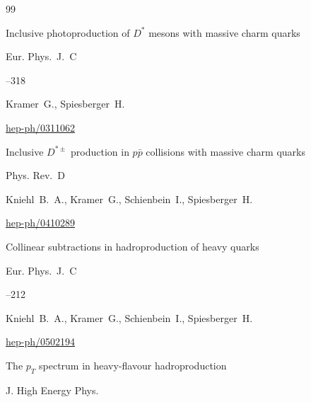 \begin{thebibliography}{99}

\paper Inclusive photoproduction of $D^*$ mesons with massive charm quarks


\jour Eur. Phys.~J.~C 



--318

\by Kramer~G., Spiesberger~H.


\arxiv \href{http://arxiv.org/abs/hep-ph/0311062}{hep-ph/0311062}






\paper Inclusive $D^{*\pm}$ production in $p\bar p$ collisions with massive charm quarks


\jour Phys. Rev.~D 



\by Kniehl~B.~A., Kramer~G., Schienbein~I., Spiesberger~H. 



\arxiv \href{http://arxiv.org/abs/hep-ph/0410289}{hep-ph/0410289}




\paper Collinear subtractions in hadroproduction of heavy quarks


\jour Eur. Phys.~J.~C 



--212

\by Kniehl~B.~A., Kramer~G., Schienbein~I., Spiesberger~H. 


\arxiv \href{http://arxiv.org/abs/hep-ph/0502194}{hep-ph/0502194}






\paper The $p_T$ spectrum in heavy-flavour hadroproduction

\jour J. High Energy Phys.


\end{thebibliography}
